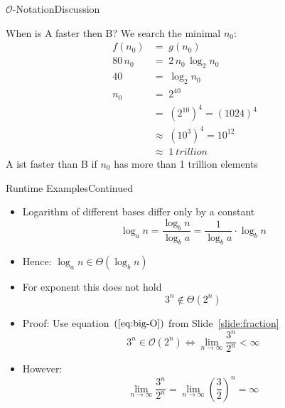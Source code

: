 
\begin{frame}{$\mathcal{O}$-Notation}{Discussion}
  \begin{block}{When is A faster then B?}
    We search the minimal $n_0$:
    \begin{align*}%
      f(n_0) & = \; g(n_0)\\
      80 \, n_0 & = \; 2 \, n_0 \, \log_2 n_0\\
      40 & = \; \log_2 n_0\\
      n_0 & = \; 2^{40}\\
      {} & = \; (2^{10})^4 = (1024)^4\\
      {} & \approx \; (10^3)^4 = 10^{12}\\
      {} & \approx \; \SI{1}{trillion}
    \end{align*}
    A ist faster than B if $n_0$ has more than 1 trillion elements
  \end{block}
\end{frame}


\begin{frame}{Runtime Examples}{Continued}
  \begin{itemize}
    \item
      Logarithm of different bases differ only by a constant
      \begin{displaymath}
        \log_a n = \dfrac{\log_b n}{\log_b a}
        = \dfrac{1}{\log_b a}\cdot \log_b n 
      \end{displaymath}
    \item
      Hence: $\log_a n \in \Theta(\log_b n)$
    \item
      For exponent this does not hold
      \begin{displaymath}
        3^n \not\in\Theta(2^n)
      \end{displaymath}
    \item
      Proof: Use equation~$(\ref{eq:big-O})$ from Slide~\ref{slide:fraction}
      \begin{displaymath}
        3^n \in \mathcal{O}(2^n)
        \Leftrightarrow \lim_{n \to \infty} \dfrac{3^n}{2^n} < \infty
      \end{displaymath}
    \item
      However:
      \begin{displaymath}
        \lim_{n \to \infty} \dfrac{3^n}{2^n} =  \lim_{n \to \infty}
        \left(\dfrac{3}{2}\right)^n = \infty
      \end{displaymath}
  \end{itemize}
\end{frame}

